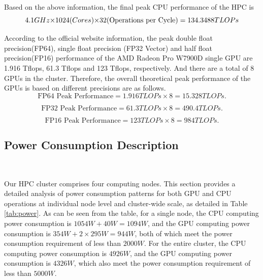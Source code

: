 Based on the above information, the final peak CPU performance of the HPC is
\begin{equation}
         4.1GHz{\times}1024(Cores){\times}32 (\text{Operations per Cycle})\\
          =134.3488TLOPs
\end{equation}


According to the official website information, the peak double float precision(FP64), single float precision (FP32 Vector)  and half float precision(FP16) performance of the AMD Radeon Pro W7900D single GPU are 1.916 Tflops, 61.3 Tflops and 123 Tflops, respectively.
And there are a total of 8 GPUs in the cluster. 
Therefore, the overall theoretical peak performance of the GPUs is based on different precisions are as follows.
\begin{equation}
    \text{FP64 Peak Performance} {=} 1.916 TLOPs \times 8 {=} 15.328 TLOPs.
\end{equation}

\begin{equation}
    \text{FP32 Peak Performance} {=} 61.3 TLOPs \times 8 {=} 490.4 TLOPs.
\end{equation}

\begin{equation}
    \text{FP16 Peak Performance} {=} 123 TLOPs \times 8 {=} 984 TLOPs.
\end{equation}



\subsection{Power Consumption Description}%
\


Our HPC cluster comprises four computing nodes. 
This section provides a detailed analysis of power consumption patterns for both GPU and CPU operations at individual node level and cluster-wide scale, as detailed in Table \ref{tab:power}. 
As can be seen from the table, for a single node, the CPU computing power consumption is $1054W{+}40W{=}1094W$, and the GPU computing power consumption is $354W{+}2×295W{=}944W$, both of which meet the power consumption requirement of less than $2000W$. 
For the entire cluster, the CPU computing power consumption is
$4926W$, and the GPU computing power consumption is $4326W$, which also meet the power consumption requirement of less than $5000W$.




